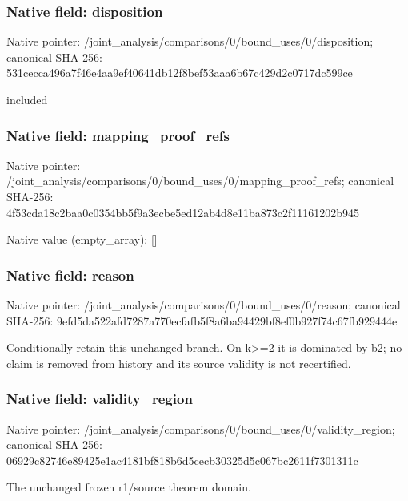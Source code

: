 \documentclass[10pt,a4paper]{article}
\begin{document}
\subsubsection{Native field: disposition}
Native pointer: /joint\_\allowbreak{}analysis/comparisons/0/bound\_\allowbreak{}uses/0/disposition; canonical SHA-256: 531cecca496a7f46e4aa9ef40641db12f8bef53aaa6b67c429d2c0717dc599ce

\begingroup\raggedright\sloppy included\par\endgroup

\subsubsection{Native field: mapping\_\allowbreak{}proof\_\allowbreak{}refs}
Native pointer: /joint\_\allowbreak{}analysis/comparisons/0/bound\_\allowbreak{}uses/0/mapping\_\allowbreak{}proof\_\allowbreak{}refs; canonical SHA-256: 4f53cda18c2baa0c0354bb5f9a3ecbe5ed12ab4d8e11ba873c2f11161202b945

Native value (empty\_\allowbreak{}array): []

\subsubsection{Native field: reason}
Native pointer: /joint\_\allowbreak{}analysis/comparisons/0/bound\_\allowbreak{}uses/0/reason; canonical SHA-256: 9efd5da522afd7287a770ecfafb5f8a6ba94429bf8ef0b927f74c67fb929444e

\begingroup\raggedright\sloppy Conditionally retain this unchanged branch. On k>=\allowbreak{}2 it is dominated by b2;\allowbreak{} no claim is removed from history and its source validity is not recertified.\par\endgroup

\subsubsection{Native field: validity\_\allowbreak{}region}
Native pointer: /joint\_\allowbreak{}analysis/comparisons/0/bound\_\allowbreak{}uses/0/validity\_\allowbreak{}region; canonical SHA-256: 06929c82746e89425e1ac4181bf818b6d5cecb30325d5c067bc2611f7301311c

\begingroup\raggedright\sloppy The unchanged frozen r1/\allowbreak{}source theorem domain.\par\endgroup
\end{document}
